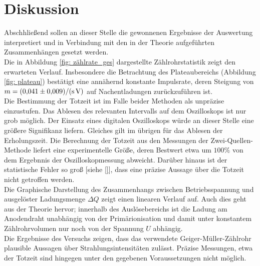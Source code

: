 \section{Diskussion}
Abschhließend sollen an dieser Stelle die gewonnenen Ergebnisse der Auswertung interpretiert und
in Verbindung mit den in der Theorie aufgeführten Zusammenhängen gesetzt werden.\\
Die in Abbildung \ref{fig: zählrate_ges} dargestellte Zählrohrstatistik zeigt den erwarteten Verlauf. Insbesondere
die Betrachtung des Plateaubereichs (Abbildung \ref{fig: plateau}) bestätigt eine annähernd konstante Impulsrate,
deren Steigung von $m = \SI{0.041 \pm 0.009}{\per\second\per\volt}$ auf Nachentladungen zurückzuführen ist.\\
Die Bestimmung der Totzeit ist im Falle beider Methoden als unpräzise einzustufen. Das Ablesen des relevanten
Intervalls auf dem Oszilloskops ist nur grob möglich. Der Einsatz eines digitalen Oszilloskops würde an dieser
Stelle eine größere Signifikanz liefern. Gleiches gilt im übrigen für das Ablesen der Erholungszeit.
Die Berechnung der Totzeit aus den Messungen der Zwei-Quellen-Methode liefert eine experimentelle Größe, deren Bestwert etwa um
$100\%$ von dem Ergebnnis der Oszilloskopmessung abweicht. Darüber hinaus ist der statistische Fehler so groß
[siehe \eqref{}], dass eine präzise Aussage über die Totzeit nicht getroffen werden.\\
Die Graphische Darstellung des Zusammenhangs zwischen Betriebsspannung und ausgelöster Ladungsmenge $\Delta Q$ zeigt
einen linearen Verlauf auf. Auch dies geht aus der Theorie hervor; innerhalb des Auslösebereichs ist die
Ladung am Anodendraht unabhängig von der Primärionisation und damit unter konstantem Zählrohrvolumen nur noch
von der Spannung $U$ abhängig. \\
Die Ergebnisse des Versuchs zeigen, dass das verwendete Geiger-Müller-Zählrohr plausible Aussagen über Strahlungsintensitäten
zulässt. Präzise Messungen, etwa der Totzeit sind hingegen unter den gegebenen Voraussetzungen nicht möglich.
